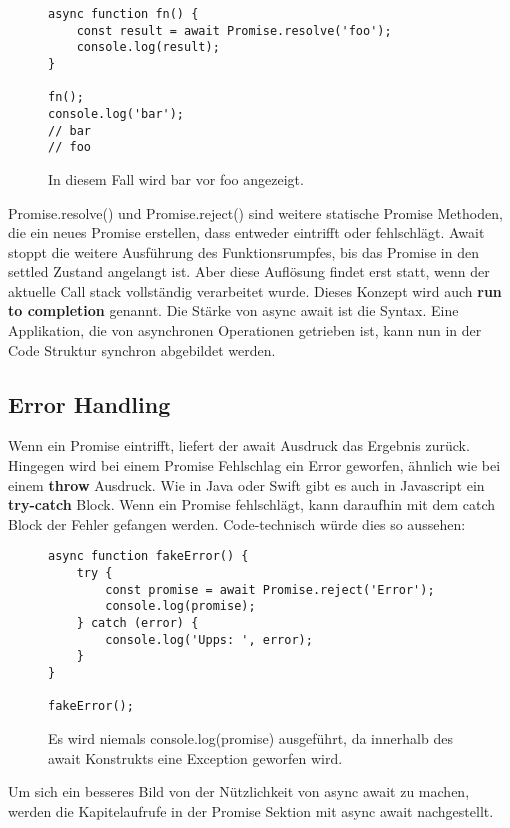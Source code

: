 \begin{figure}[H]
\begin{lstlisting}[basicstyle=\small]
async function fn() {
    const result = await Promise.resolve('foo');
    console.log(result);
}

fn();
console.log('bar');
// bar
// foo
\end{lstlisting}
\caption{In diesem Fall wird bar vor foo angezeigt.}
\end{figure}

\noindent
Promise.resolve() und Promise.reject() sind weitere statische Promise Methoden, die ein neues Promise erstellen, dass entweder eintrifft oder fehlschlägt. Await stoppt die weitere Ausführung des Funktionsrumpfes, bis das Promise in den settled Zustand angelangt ist. Aber diese Auflösung findet erst statt, wenn der aktuelle Call stack vollständig verarbeitet wurde. Dieses Konzept wird auch \textbf{run to completion} genannt. Die Stärke von async await ist die Syntax. Eine Applikation, die von asynchronen Operationen getrieben ist, kann nun in der Code Struktur synchron abgebildet werden. 

\subsection{Error Handling}
Wenn ein Promise eintrifft, liefert der await Ausdruck das Ergebnis zurück. Hingegen wird bei einem Promise Fehlschlag ein Error geworfen, ähnlich wie bei einem \textbf{throw} Ausdruck. Wie in Java oder Swift gibt es auch in Javascript ein \textbf{try-catch} Block. Wenn ein Promise fehlschlägt, kann daraufhin mit dem catch Block der Fehler gefangen werden. Code-technisch würde dies so aussehen: 

\begin{figure}[H]
\begin{lstlisting}[basicstyle=\small]
async function fakeError() {
    try {
        const promise = await Promise.reject('Error');
        console.log(promise);
    } catch (error) {
        console.log('Upps: ', error);
    }
}

fakeError();
\end{lstlisting}
\caption{Es wird niemals console.log(promise) ausgeführt, da innerhalb des await Konstrukts eine Exception geworfen wird.}
\end{figure}

\noindent
Um sich ein besseres Bild von der Nützlichkeit von async await zu machen, werden die Kapitelaufrufe in der Promise Sektion mit async await nachgestellt. 

